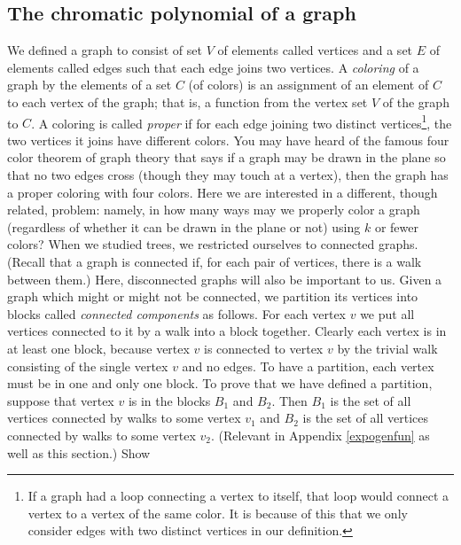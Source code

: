 \subsection{The chromatic polynomial of a graph}
We defined a graph to consist of set $V$ of elements called
vertices and a set $E$ of elements called edges such that each edge joins
two vertices.  A {\em coloring} of a graph by the elements of a set
$C$ (of colors) is an assignment of an element of $C$ to each vertex of
the graph; that is, a function from the vertex set $V$ of the graph to
$C$.  A coloring is called {\em proper} if for each edge joining two distinct vertices\footnote{If a
graph had a loop connecting a vertex to itself, that loop would connect a
vertex to a vertex of the same color.  It is because of this that we only
consider edges with two distinct vertices in our definition.}, the two
vertices it joins have different colors. You may have heard of the famous
four color theorem of graph theory that says if a graph may be drawn in
the plane so that no two edges cross (though they may touch at a vertex),
then the graph has a proper coloring with four colors.  Here we are
interested in a different, though related, problem: namely, in how many
ways may we properly color a graph (regardless of whether it can be drawn
in the plane or not) using
$k$ or fewer colors?  When we studied trees, we restricted ourselves to
connected graphs. (Recall that a graph is connected if, for each pair of
vertices, there is a walk between them.)  Here, disconnected graphs will
also be important to us.  Given a graph which might or might not be
connected, we partition its vertices into blocks called {\em connected
components} as follows.  For each vertex
$v$ we put all vertices connected to it by a walk into a block together. 
Clearly each vertex is in at least one block, because vertex
$v$ is connected to vertex $v$ by the trivial walk consisting of the
single vertex $v$ and no edges.  To have a partition, each vertex must be
in one and only one block.  To prove that we have defined a
partition, suppose that vertex
$v$ is in the blocks
$B_1$ and $B_2$.  Then $B_1$ is the set of all
vertices connected by walks to some vertex $v_1$ and $B_2$ is the set of
all vertices connected by walks to some vertex $v_2$.  
\bp
\itemes (Relevant in Appendix \ref{expogenfun} as well as this section.) Show
